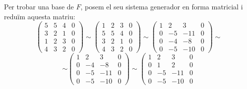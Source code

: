 \documentclass[a4paper, 12pt]{article}
\begin{document}
    \begin{solucio}
        Per trobar una base de $F$, posem el seu sistema generador en forma matricial i reduïm aquesta
        matriu: 
        \begin{displaymath}
            \left(
                \begin{array}{cccc}
                    5 & 5 & 4 & 0\\
                    3 & 2 & 1 & 0\\
                    1 & 2 & 3 & 0\\
                    4 & 3 & 2 & 0
                \end{array}
            \right)
            \sim
            \left(
                \begin{array}{cccc}
                    1 & 2 & 3 & 0\\
                    5 & 5 & 4 & 0\\
                    3 & 2 & 1 & 0\\
                    4 & 3 & 2 & 0
                \end{array}
            \right)
            \sim
            \left(
                \begin{array}{cccc}
                    1 & 2 & 3 & 0\\
                    0 & -5 & -11 & 0\\
                    0 & -4 & -8 & 0\\
                    0 & -5 & -10 & 0
                \end{array}
            \right)
            \sim
        \end{displaymath}
        \begin{displaymath}
            \sim
            \left(
                \begin{array}{cccc}
                    1 & 2 & 3 & 0\\
                    0 & -4 & -8 & 0\\
                    0 & -5 & -11 & 0\\
                    0 & -5 & -10 & 0
                \end{array}
            \right)
            \sim
            \left(
                \begin{array}{cccc}
                    1 & 2 & 3 & 0\\
                    0 & 1 & 2 & 0\\
                    0 & -5 & -11 & 0\\
                    0 & -5 & -10 & 0

\end{array}
\end{displaymath}
\end{solucio}
\end{document}
